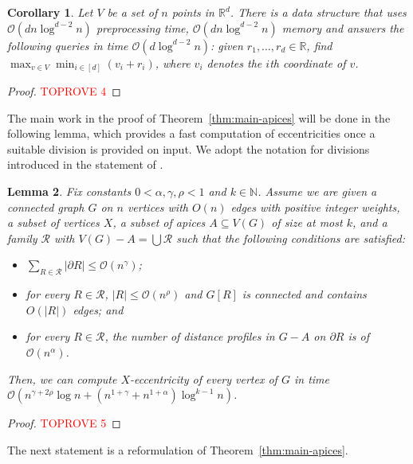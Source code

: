 \documentclass[11pt,a4paper]{article}
\newtheorem{lemma}{Lemma}[section]
\newtheorem{corollary}[lemma]{Corollary}
\newcommand{\Oh}{\mathcal{O}}
\renewcommand{\leq}{\leqslant}
\renewcommand{\setminus}{-}
\begin{document}
\begin{corollary}\label{l:max_min_query}
Let $V$ be a set of $n$ points in $\mathbb{R}^d$.
There is a data structure that uses $\Oh \left( d n \log^{d - 2} n \right)$ preprocessing time, $\Oh \left( d n \log^{d - 2} n \right)$ memory and answers the following queries in time $\Oh \left( d \log^{d - 2} n \right)$: given $r_1, \dots, r_d \in \mathbb{R}$, find $\max_{v \in V} \min_{i \in [d]} (v_i + r_i)$, where $v_i$ denotes the $i$th coordinate of $v$.
\end{corollary}

\begin{proof}\textcolor{red}{TOPROVE 4}\end{proof}

The main work in the proof of Theorem~\ref{thm:main-apices} will be done in the following lemma,
which provides a fast computation of eccentricities once a suitable division is provided on input.
We adopt the notation for divisions introduced in the statement of .

\begin{lemma}\label{l:main_ecc}
Fix constants $0 < \alpha, \gamma, \rho < 1$ and $k \in \mathbb{N}$. Assume we are given a connected graph $G$ on $n$ vertices with $O(n)$ edges with positive integer weights, a subset of vertices $X$, a subset of apices $A \subseteq V(G)$ of size at most $k$, and a family $\mathcal{R}$ with $V(G) \setminus A = \bigcup \mathcal{R} $ such that the following conditions are satisfied:
\begin{itemize}[nosep]
	\item $\sum_{R \in \mathcal{R}} |\partial R| \leq \Oh(n^\gamma)$;
	\item for every $R \in \mathcal{R}$, $|R| \leq \Oh(n^\rho)$ and $G[R]$ is connected and contains $O(|R|)$ edges; and
	\item for every $R \in \mathcal{R}$, the number of distance profiles in $G-A$ on $\partial R$ is of $\Oh(n^\alpha)$.
\end{itemize}
Then, we can compute $X$-eccentricity of every vertex of $G$ in time $\Oh(n^{\gamma + 2\rho} \log n + (n^{1 + \gamma} + n^{1 + \alpha}) \log^{k - 1} n)$.
\end{lemma}

\begin{proof}\textcolor{red}{TOPROVE 5}\end{proof}

The next statement is a reformulation of Theorem~\ref{thm:main-apices}. 
\end{document}
